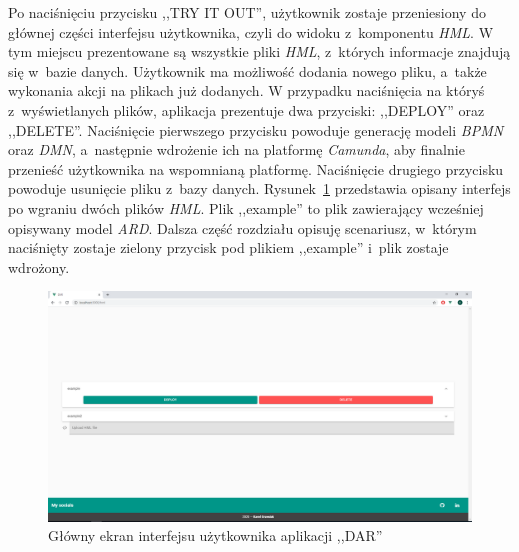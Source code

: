Po naciśnięciu przycisku ,,TRY IT OUT'', użytkownik zostaje przeniesiony do głównej części interfejsu użytkownika, czyli do widoku z~komponentu \emph{HML}. W tym miejscu prezentowane są wszystkie pliki \emph{HML}, z~których informacje znajdują się w~bazie danych. Użytkownik ma możliwość dodania nowego pliku, a~także wykonania akcji na plikach już dodanych. W przypadku naciśnięcia na któryś z~wyświetlanych plików, aplikacja prezentuje dwa przyciski: ,,DEPLOY'' oraz ,,DELETE''. Naciśnięcie pierwszego przycisku powoduje generację modeli \emph{BPMN} oraz \emph{DMN}, a~następnie wdrożenie ich na platformę \emph{Camunda}, aby finalnie przenieść użytkownika na wspomnianą platformę. Naciśnięcie drugiego przycisku powoduje usunięcie pliku z~bazy danych. Rysunek~\ref{fig:darHML} przedstawia opisany interfejs po wgraniu dwóch plików \emph{HML}. Plik ,,example'' to plik zawierający wcześniej opisywany model \emph{ARD}. Dalsza część rozdziału opisuję scenariusz, w~którym naciśnięty zostaje zielony przycisk pod plikiem ,,example'' i~plik zostaje wdrożony.  
\begin{figure}
    \centering
    \includegraphics[width=\textwidth]{./assets/darHML.png}
    \caption{Główny ekran interfejsu użytkownika aplikacji ,,DAR''}
    \label{fig:darHML}
\end{figure}

